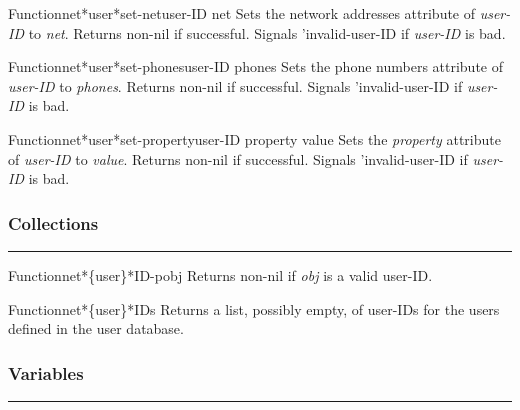 \begin{functiondoc}{Function}{net*user*set-net}{user-ID net}
Sets the network addresses attribute of {\em user-ID} to {\em net}.
Returns non-nil if successful. Signals 'invalid-user-ID if {\em user-ID} is bad.
\end{functiondoc}

\begin{functiondoc}{Function}{net*user*set-phones}{user-ID phones}
Sets the phone numbers attribute of {\em user-ID} to {\em phones}.
Returns non-nil if successful. Signals 'invalid-user-ID if {\em user-ID} is bad.
\end{functiondoc}

\begin{functiondoc}{Function}{net*user*set-property}{user-ID property value}
Sets the {\em property} attribute of {\em user-ID} to {\em value}.
Returns non-nil if successful. Signals 'invalid-user-ID if {\em user-ID} is bad.
\end{functiondoc}


\subsubsection*{Collections}
\par\vspace*{0.00in}\par\hrule\par\medskip\par


\begin{functiondoc}{Function}{net*\{user\}*ID-p}{obj}
Returns non-nil if {\em obj} is a valid user-ID.
\end{functiondoc}

\begin{functiondoc}{Function}{net*\{user\}*IDs}{}
Returns a list, possibly empty, of user-IDs for the users defined in the 
user database.
\end{functiondoc}


\subsubsection*{Variables}
\par\vspace*{0.00in}\par\hrule\par\medskip\par


